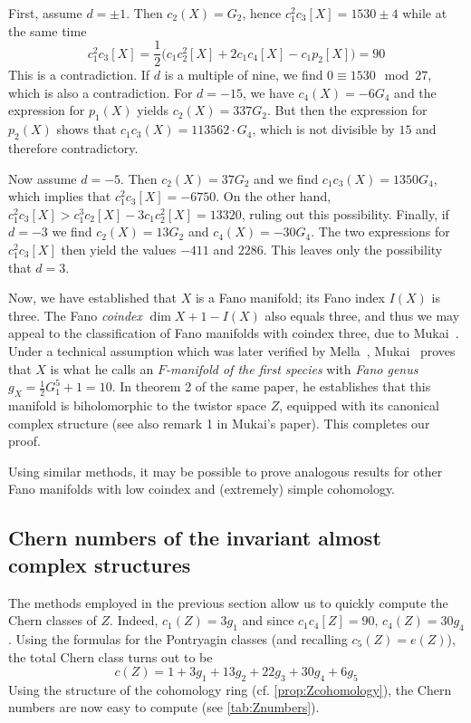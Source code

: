\begin{myproof}
	First, assume $d=\pm 1$. Then $c_2(X)=G_2$, hence $c_1^2c_3[X]=1530\pm 4$ while at the same time
	\begin{equation*}
		c_1^2c_3[X]=\frac{1}{2}\big(c_1c_2^2[X]+2c_1c_4[X]-c_1p_2[X]\big)=90
	\end{equation*}
	This is a contradiction. If $d$ is a multiple of nine, we find $0\equiv 1530\mod 27$, which is also a contradiction. For $d=-15$, we have $c_4(X)=-6G_4$ and the expression for $p_1(X)$ yields $c_2(X)=337G_2$. But then the expression for $p_2(X)$ shows that $c_1c_3(X)=113562\cdot G_4$, which is not divisible by $15$ and therefore contradictory. 
	
	Now assume $d=-5$. Then $c_2(X)=37 G_2$ and we find $c_1c_3(X)=1350 G_4$, which implies that $c_1^2c_3[X]=-6750 $. On the other hand, $c_1^2c_3[X]>c_1^3c_2[X]-3c_1c_2^2[X]=13320$, ruling out this possibility. Finally, if $d=-3$ we find $c_2(X)=13 G_2$ and $c_4(X)=-30 G_4$. The two expressions for $c_1^2c_3[X]$ then yield the values $-411$ and $2286$. This leaves only the possibility that $d=3$.
	
	Now, we have established that $X$ is a Fano manifold; its Fano index $I(X)$ is three. The Fano \emph{coindex} $\dim X+1-I(X)$ also equals three, and thus we may appeal to the classification of Fano manifolds with coindex three, due to Mukai~\cite{Muk1989}. Under a technical assumption which was later verified by Mella~\cite{Mel1999}, Mukai~\cite[Prop.~1]{Muk1989} proves that $X$ is what he calls an \emph{$F$-manifold of the first species} with \emph{Fano genus} $g_X=\frac{1}{2}G_1^5+1=10$. In theorem 2 of the same paper, he establishes that this manifold is biholomorphic to the twistor space $Z$, equipped with its canonical complex structure (see also remark 1 in Mukai's paper). This completes our proof.
\end{myproof}

\begin{rem}
	Using similar methods, it may be possible to prove analogous results for other Fano manifolds with low coindex and (extremely) simple cohomology.
\end{rem}

\subsection{Chern numbers of the invariant almost complex structures}

The methods employed in the previous section allow us to quickly compute the Chern classes of $Z$. Indeed, $c_1(Z)=3g_1$ and since $c_1c_4[Z]=90$, $c_4(Z)=30g_4$. Using the formulas for the Pontryagin classes (and recalling $c_5(Z)=e(Z)$), the total Chern class turns out to  be
\begin{equation*}
	c(Z)=1+3g_1+13g_2+22g_3+30g_4+6g_5
\end{equation*}
Using the structure of the cohomology ring (cf. \cref{prop:Zcohomology}), the Chern numbers are now easy to compute (see \cref{tab:Znumbers}).

